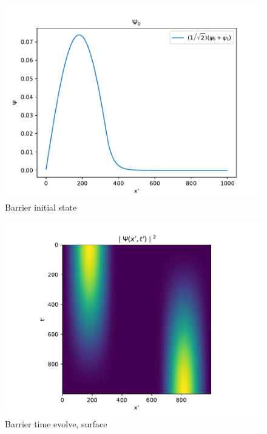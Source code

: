 \documentclass{article}
\begin{document}
\begin{figure}
    \includegraphics[width=\linewidth]{./media/initial_state.pdf}
    \caption{Barrier initial state}
    \label{fig:barrier-initial-state}
\end{figure}

\begin{figure}
    \includegraphics[width=\linewidth]{./media/time_evolve_surface.pdf}
    \caption{Barrier time evolve, surface}
    \label{fig:barrier-evolve-surface}
\end{figure}
\end{document}
